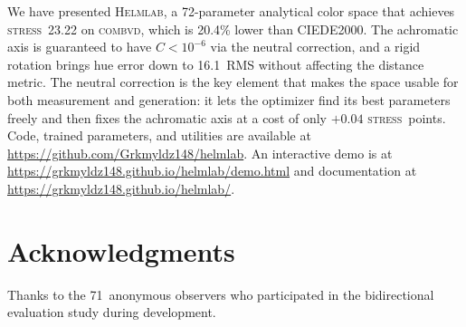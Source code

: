 \documentclass[11pt, twocolumn]{article}
\newcommand{\helmlab}{\textsc{Helmlab}}
\newcommand{\stress}{\textsc{stress}}
\newcommand{\combvd}{\textsc{combvd}}
\begin{document}
We have presented \helmlab, a 72-parameter analytical color space
that achieves \stress\ 23.22 on \combvd, which is 20.4\% lower than
CIEDE2000. The achromatic axis is guaranteed to have $C < 10^{-6}$
via the neutral correction, and a rigid rotation brings hue error
down to 16.1\textdegree\ RMS without affecting the distance metric.
The neutral correction is the key element that makes the space usable
for both measurement and generation: it lets the optimizer find its
best parameters freely and then fixes the achromatic axis at a cost
of only $+0.04$ \stress\ points.
Code, trained parameters, and utilities are available at
\url{https://github.com/Grkmyldz148/helmlab}. An interactive demo
is at \url{https://grkmyldz148.github.io/helmlab/demo.html} and
documentation at \url{https://grkmyldz148.github.io/helmlab/}.


\section*{Acknowledgments}

Thanks to the 71~anonymous observers who participated in the
bidirectional evaluation study during development.
\end{document}
